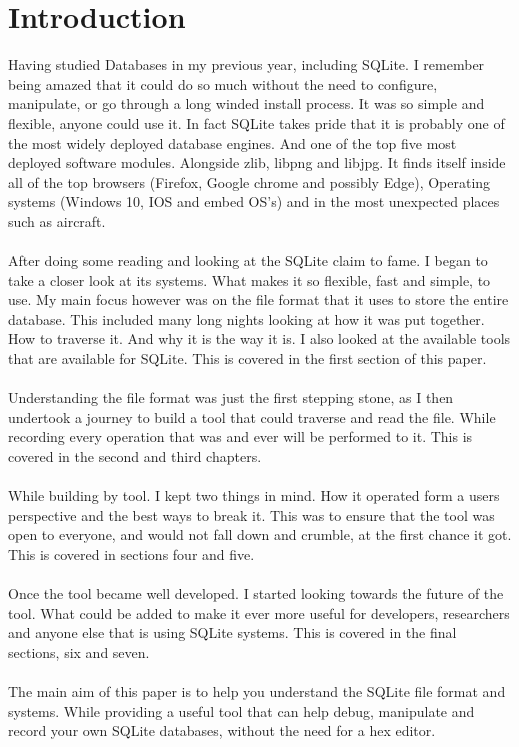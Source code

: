 \section*{Introduction}
\label{sec:introduction}

Having studied Databases in my previous year, including SQLite. I remember being amazed that it could do so much without the need to configure, manipulate, or go through a long winded install process. It was so simple and flexible, anyone could use it. In fact SQLite takes pride that it is probably one of the most widely deployed database engines. And one of the top five most deployed software modules. Alongside zlib, libpng and libjpg. It finds itself inside all of the top browsers (Firefox, Google chrome and possibly Edge), Operating systems (Windows 10, IOS and embed OS's) and in the most unexpected places such as aircraft.
\\\\
After doing some reading and looking at the SQLite claim to fame. I began to take a closer look at its systems. What makes it so flexible, fast and simple, to use. My main focus however was on the file format that it uses to store the entire database. This included many long nights looking at how it was put together. How to traverse it. And why it is the way it is. I also looked at the available tools that are available for SQLite. This is covered in the first section of this paper.
\\\\
Understanding the file format was just the first stepping stone, as I then undertook a journey to build a tool that could traverse and read the file. While recording every operation that was and ever will be performed to it. This is covered in the second and third chapters.
\\\\
While building by tool. I kept two things in mind. How it operated form a users perspective and the best ways to break it. This was to ensure that the tool was open to everyone, and would not fall down and crumble, at the first chance it got. This is covered in sections four and five. 
\\\\
Once the tool became well developed. I started looking towards the future of the tool. What could be added to make it ever more useful for developers, researchers and anyone else that is using SQLite systems. This is covered in the final sections, six and seven.
\\\\
The main aim of this paper is to help you understand the SQLite file format and systems. While providing a useful tool that can help debug, manipulate and record your own SQLite databases, without the need for a hex editor.